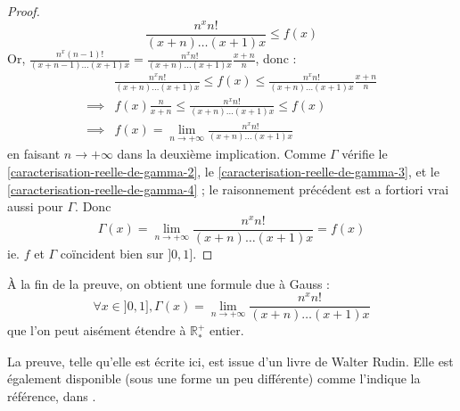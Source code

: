 \begin{proof}
    \[ \frac{n^x n!}{(x+n) \dots (x+1)x} \leq f(x) \]
    Or, $\frac{n^x (n-1)!}{(x+n-1) \dots (x+1)x} = \frac{n^x n!}{(x+n) \dots (x+1)x} \frac{x+n}{n}$, donc :
    \begin{align*}
      &\frac{n^x n!}{(x+n) \dots (x+1)x} \leq f(x) \leq \frac{n^x n!}{(x+n) \dots (x+1)x} \frac{x+n}{n} \\
      \implies & f(x) \frac{n}{x+n} \leq \frac{n^x n!}{(x+n) \dots (x+1)x} \leq f(x) \\
      \implies & f(x) = \lim_{n \rightarrow +\infty} \frac{n^x n!}{(x+n) \dots (x+1)x}
    \end{align*}
    en faisant $n \longrightarrow +\infty$ dans la deuxième implication. Comme $\Gamma$ vérifie le \cref{caracterisation-reelle-de-gamma-2}, le \cref{caracterisation-reelle-de-gamma-3}, et le \cref{caracterisation-reelle-de-gamma-4} ; le raisonnement précédent est a fortiori vrai aussi pour $\Gamma$. Donc
    \[ \Gamma(x) = \lim_{n \rightarrow +\infty} \frac{n^x n!}{(x+n) \dots (x+1)x} = f(x)  \]
    ie. $f$ et $\Gamma$ coïncident bien sur $]0, 1]$.
  \end{proof}

  \begin{remark}
    À la fin de la preuve, on obtient une formule due à Gauss :
    \[ \forall x \in ]0, 1], \Gamma(x) = \lim_{n \rightarrow +\infty} \frac{n^x n!}{(x+n) \dots (x+1)x} \]
    que l'on peut aisément étendre à $\mathbb{R}^+_*$ entier.
  \end{remark}

  La preuve, telle qu'elle est écrite ici, est issue d'un livre de Walter Rudin. Elle est également disponible (sous une forme un peu différente) comme l'indique la référence, dans \cite{[ROM19-1]}.

